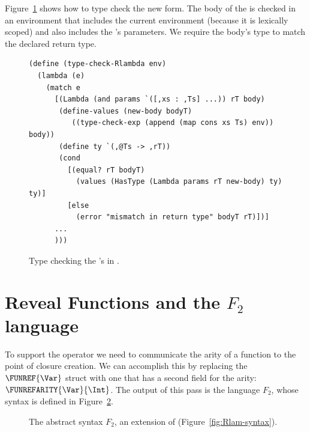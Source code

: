 \documentclass[11pt]{book}
\newcommand{\gray}[1]{{\color{gray} #1}}
\begin{document}
\label{sec:type-check-r5}

Figure~\ref{fig:type-check-Rlambda} shows how to type check the new
 form. The body of the  is checked in an
environment that includes the current environment (because it is
lexically scoped) and also includes the 's parameters.  We
require the body's type to match the declared return type.

\begin{figure}[tbp]
\begin{lstlisting}
(define (type-check-Rlambda env)
  (lambda (e)
    (match e
      [(Lambda (and params `([,xs : ,Ts] ...)) rT body)
       (define-values (new-body bodyT) 
          ((type-check-exp (append (map cons xs Ts) env)) body))
       (define ty `(,@Ts -> ,rT))
       (cond
         [(equal? rT bodyT)
           (values (HasType (Lambda params rT new-body) ty) ty)]
         [else
           (error "mismatch in return type" bodyT rT)])]
      ...
      )))
\end{lstlisting}
\caption{Type checking the 's in \LangLam{}.}
\label{fig:type-check-Rlambda}
\end{figure}


\section{Reveal Functions and the $F_2$ language}
\label{sec:reveal-functions-r5}


To support the  operator we need to communicate
the arity of a function to the point of closure creation.  We can
accomplish this by replacing the $\FUNREF{\Var}$ struct with one that
has a second field for the arity: $\FUNREFARITY{\Var}{\Int}$.  The
output of this pass is the language $F_2$, whose syntax is defined in
Figure~\ref{fig:f2-syntax}.

\begin{figure}[tp]
\centering
\fbox{
\begin{minipage}{0.96\textwidth}
\[
\begin{array}{lcl}
\Exp &::=& \ldots \mid \FUNREFARITY{\Var}{\Int}\\
 \Def &::=& \gray{ \FUNDEF{\Var}{([\Var \code{:} \Type]\ldots)}{\Type}{\code{'()}}{\Exp} }\\
  F_2 &::=& \gray{\PROGRAMDEFS{\code{'()}}{\LP \Def\ldots \RP}}
\end{array}
\]
\end{minipage}
}
\caption{The abstract syntax $F_2$, an extension of \LangLam{}
  (Figure~\ref{fig:Rlam-syntax}).}
\label{fig:f2-syntax}
\end{figure}
\end{document}
